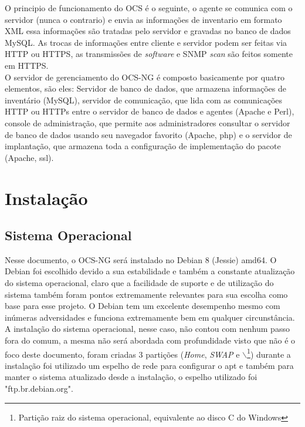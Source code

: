 \documentclass[
               12pt,             %
               a4paper,          %
               chapter=TITLE,    %
               section=TITLE,    %
               english,
               brazil            
]{article}
\begin{document}
O principio de funcionamento do OCS é o seguinte, o agente se comunica com o servidor (nunca o contrario) e envia as informações de inventario em formato XML essa informações são tratadas pelo servidor e gravadas no banco de dados MySQL. As trocas de informações entre cliente e servidor podem ser feitas via HTTP ou HTTPS, as transmissões de \textit{software} e SNMP \textit{scan} são feitos somente em HTTPS.\\

O servidor de gerenciamento do OCS-NG é composto basicamente por quatro elementos, são eles: Servidor de banco de dados, que armazena informações de inventário (MySQL), servidor de comunicação, que lida com as comunicações HTTP ou HTTPs entre o servidor de banco de dados e agentes (Apache e Perl), console de administração, que permite aos administradores consultar o servidor de banco de dados usando seu navegador favorito (Apache, php) e o servidor de implantação, que armazena toda a configuração de implementação do pacote (Apache, ssl).

\pagebreak

\section{Instalação}

\subsection{Sistema Operacional}

Nesse documento, o OCS-NG será instalado no Debian 8 (Jessie) amd64. O Debian foi escolhido devido a sua estabilidade e também a constante atualização do sistema operacional, claro que a facilidade de suporte e de utilização do sistema também foram pontos extremamente relevantes para sua escolha como base para esse projeto. O Debian tem um excelente desempenho mesmo com inúmeras adversidades e funciona extremamente bem em qualquer circunstância.\\

A instalação do sistema operacional, nesse caso, não contou com nenhum passo fora do comum, a mesma não será abordada com profundidade visto que não é o foco deste documento, foram criadas 3 partições (\textit{Home}, \textit{SWAP} e $\backslash$\footnote{Partição raiz do sistema operacional, equivalente ao disco C do Windows}) durante a instalação foi utilizado um espelho de rede para configurar o apt e também para manter o sistema atualizado desde a instalação, o espelho utilizado foi "ftp.br.debian.org".\\
\end{document}
